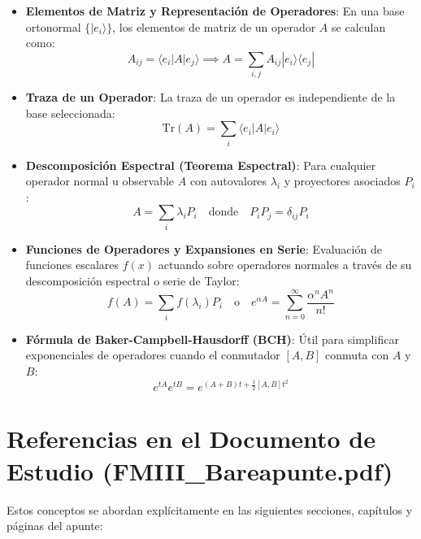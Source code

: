 \documentclass{article}
\begin{document}
\begin{itemize}
    \item \textbf{Elementos de Matriz y Representación de Operadores}:
    En una base ortonormal $\{|e_i\rangle\}$, los elementos de matriz de un operador $A$ se calculan como:
    \[
    A_{ij} = \langle e_i|A|e_j\rangle \implies A = \sum_{i,j} A_{ij} |e_i\rangle\langle e_j|
    \]
    \item \textbf{Traza de un Operador}:
    La traza de un operador es independiente de la base seleccionada:
    \[
    \text{Tr}(A) = \sum_i \langle e_i|A|e_i\rangle
    \]
    \item \textbf{Descomposición Espectral (Teorema Espectral)}:
    Para cualquier operador normal u observable $A$ con autovalores $\lambda_i$ y proyectores asociados $P_i$:
    \[
    A = \sum_i \lambda_i P_i \quad \text{donde} \quad P_i P_j = \delta_{ij} P_i
    \]
    \item \textbf{Funciones de Operadores y Expansiones en Serie}:
    Evaluación de funciones escalares $f(x)$ actuando sobre operadores normales a través de su descomposición espectral o serie de Taylor:
    \[
    f(A) = \sum_i f(\lambda_i) P_i \quad \text{o} \quad e^{\alpha A} = \sum_{n=0}^{\infty} \frac{\alpha^n A^n}{n!}
    \]
    \item \textbf{Fórmula de Baker-Campbell-Hausdorff (BCH)}:
    Útil para simplificar exponenciales de operadores cuando el conmutador $[A, B]$ conmuta con $A$ y $B$:
    \[
    e^{tA} e^{tB} = e^{(A+B)t + \frac{1}{2}[A,B]t^2}
    \]
\end{itemize}

\section{Referencias en el Documento de Estudio (FMIII\_Bareapunte.pdf)}

Estos conceptos se abordan explícitamente en las siguientes secciones, capítulos y páginas del apunte:
\end{document}
